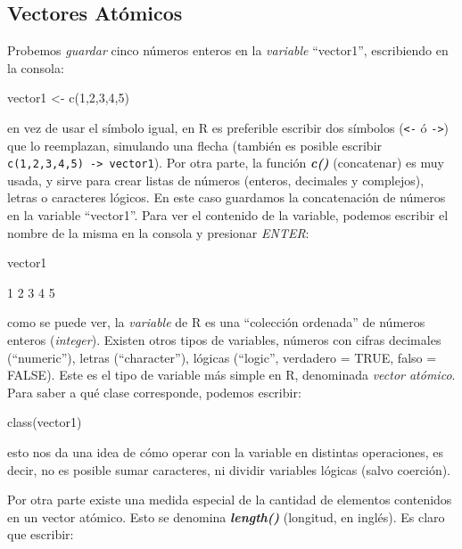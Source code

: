 \documentclass[11pt,a4paper]{article}
\begin{document}
\subsection{Vectores Atómicos}

Probemos \textit{guardar} cinco números enteros en la \textit{variable} ``vector1'', escribiendo en la consola:

\begin{Schunk}
\begin{Sinput}
vector1 <- c(1,2,3,4,5)
\end{Sinput}
\end{Schunk}

\noindent en vez de usar el símbolo igual, en R es preferible escribir dos símbolos (\texttt{<-} ó \texttt{->}) que lo reemplazan,  simulando una flecha (también es posible escribir \texttt{c(1,2,3,4,5) -> vector1}). Por otra parte, la función \textbf{\textit{c()}} (concatenar) es muy usada, y sirve para crear listas de números (enteros, decimales y complejos), letras o caracteres lógicos. En este caso guardamos la concatenación de números en la variable ``vector1''. Para ver el contenido de la variable, podemos escribir el nombre de la misma en la consola y presionar \textit{ENTER}:

\begin{Schunk}
\begin{Sinput}
vector1
\end{Sinput}
\begin{Soutput}
[1] 1 2 3 4 5
\end{Soutput}
\end{Schunk}

\noindent como se puede ver, la \textit{variable} de R es una ``colección ordenada'' de números enteros (\textit{integer}). Existen otros tipos de variables, números con cifras decimales (``numeric''), letras (``character''), lógicas (``logic'', verdadero = TRUE, falso = FALSE). Este es el tipo de variable más simple en R, denominada \textit{vector atómico}. Para saber a qué clase corresponde, podemos escribir:

\begin{Schunk}
\begin{Sinput}
 class(vector1)
\end{Sinput}
\end{Schunk}
\noindent  esto nos da una idea de cómo operar con la variable en distintas operaciones, es decir, no es posible sumar caracteres, ni dividir variables lógicas (salvo coerción).

Por otra parte existe una medida especial de la cantidad de elementos contenidos en un vector atómico. Esto se denomina \textit{\textbf{length()}} (longitud, en inglés). Es claro que escribir:
\end{document}

